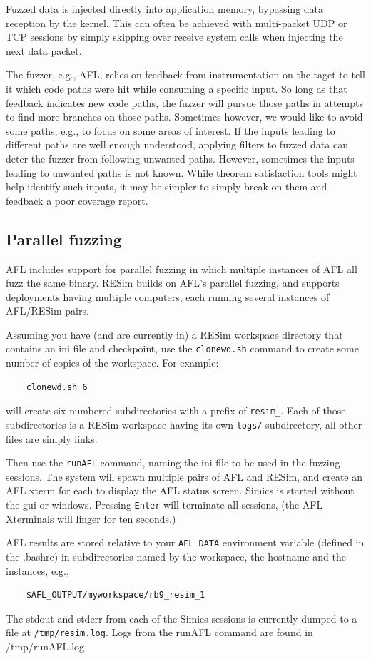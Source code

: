 \documentclass[titlepage]{article}
\begin{document}
Fuzzed data is injected directly into application memory, bypassing data reception by the kernel.
This can often be achieved with multi-packet UDP or TCP sessions by simply skipping over receive system
calls when injecting the next data packet.

The fuzzer, e.g., AFL, relies on feedback from instrumentation on the taget to tell it which code paths
were hit while consuming a specific input.  So long as that feedback indicates new code paths, the fuzzer
will pursue those paths in attempts to find more branches on those paths.  Sometimes however, we would like
to avoid some paths, e.g., to focus on some areas of interest.  If the inputs leading to different paths
are well enough understood, applying filters to fuzzed data can deter the fuzzer from following unwanted paths.
However, sometimes the inputs leading to unwanted paths is not known.  While theorem satisfaction tools might
help identify such inputs, it may be simpler to simply break on them and feedback a poor coverage report.

\subsection{Parallel fuzzing}
\label{parallel-fuzzing}
AFL includes support for parallel fuzzing in which multiple instances of AFL all fuzz the same binary.
RESim builds on AFL's parallel fuzzing, and supports deployments having multiple computers, each running
several instances of AFL/RESim pairs.

Assuming you have (and are currently in) a RESim workspace directory that contains an ini file and checkpoint, use the {\tt clonewd.sh}
command to create some number of copies of the workspace.  For example:
\begin{verbatim}
    clonewd.sh 6
\end{verbatim}
\noindent will create six numbered subdirectories with a prefix of {\tt resim\_}.  Each of those subdirectories is a RESim workspace
having its own {\tt logs/} subdirectory,  all other files are simply links.

Then use the {\tt runAFL} command, naming the ini file to be used in the fuzzing sessions.  The system will spawn multiple pairs of
AFL and RESim, and create an AFL xterm for each to display the AFL status screen.  Simics is started without the gui or windows.
Pressing {\tt Enter} will terminate all sessions, (the AFL Xterminals will linger for ten seconds.)

AFL results are stored relative to your {\tt AFL\_DATA} environment variable (defined in the .bashrc) in subdirectories named by the workspace, the hostname and the instances, e.g.,
\begin{verbatim}
    $AFL_OUTPUT/myworkspace/rb9_resim_1
\end{verbatim}
The stdout and stderr from each of the Simics sessions is currently dumped to a file at {\tt /tmp/resim.log}.
Logs from the runAFL command are found in /tmp/runAFL.log
\end{document}

